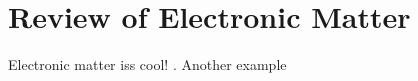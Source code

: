 \section{\label{sec:electronicMatter}Review of Electronic Matter}

Electronic matter \cite{haldane_model_1988} iss cool! \cite[testi]{fu_topological_2007}. Another example \cite[testi]{barber_phase_1980}